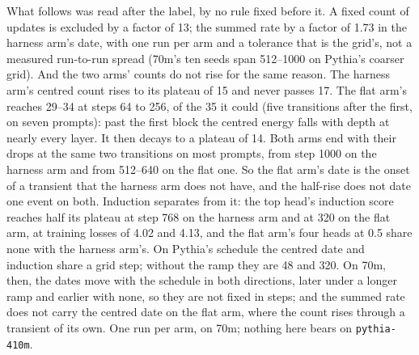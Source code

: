 \documentclass[11pt]{article}
\begin{document}
What follows was read after the label, by no rule fixed before it. A fixed count of updates is excluded by a factor of 13; the summed rate by a factor of 1.73 in the harness arm's date, with one run per arm and a tolerance that is the grid's, not a measured run-to-run spread (70m's ten seeds span 512--1000 on Pythia's coarser grid). And the two arms' counts do not rise for the same reason. The harness arm's centred count rises to its plateau of 15 and never passes 17. The flat arm's reaches 29--34 at steps 64 to 256, of the 35 it could (five transitions after the first, on seven prompts): past the first block the centred energy falls with depth at nearly every layer. It then decays to a plateau of 14. Both arms end with their drops at the same two transitions on most prompts, from step 1000 on the harness arm and from 512--640 on the flat one. So the flat arm's date is the onset of a transient that the harness arm does not have, and the half-rise does not date one event on both. Induction separates from it: the top head's induction score reaches half its plateau at step 768 on the harness arm and at 320 on the flat arm, at training losses of 4.02 and 4.13, and the flat arm's four heads at 0.5 share none with the harness arm's. On Pythia's schedule the centred date and induction share a grid step; without the ramp they are 48 and 320. On 70m, then, the dates move with the schedule in both directions, later under a longer ramp and earlier with none, so they are not fixed in steps; and the summed rate does not carry the centred date on the flat arm, where the count rises through a transient of its own. One run per arm, on 70m; nothing here bears on \texttt{pythia-410m}.
\end{document}
